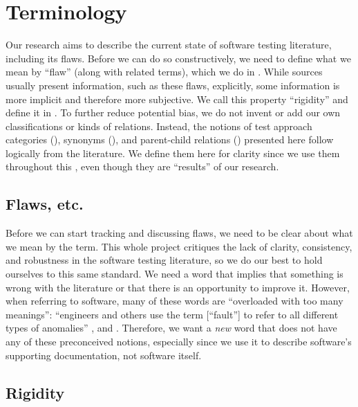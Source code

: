 \section{Terminology}
\label{terminology}

Our research aims to describe the current state of software testing literature,
including its flaws. Before we can do so constructively, we need to define what
we mean by ``flaw'' (along with related terms), which we do in .
While sources usually present information, such as these flaws, explicitly,
some information is more implicit and therefore more subjective. We call
this property ``rigidity'' and define it in . To further
reduce potential bias, we do not invent or add our own
classifications or kinds of relations. Instead, the notions of test approach
categories (), synonyms (), and
parent-child relations () presented here
follow logically from the literature. We define them here for clarity
since we use them throughout this \docType{}, even though they are
``results'' of our research.

\subsection{Flaws, etc.}\label{flaw-def}

Before we can start tracking and discussing flaws, we need to be clear about
what we mean by the term. This whole project critiques the lack of clarity,
consistency, and robustness in the software testing literature, so we do our
best to hold ourselves to this same standard.
We need a word that implies that something is wrong with the literature
or that there is an opportunity to improve it. However, when referring to
software, many of these words are ``overloaded with too many meanings'':
``engineers and others use the term [``fault''] to refer to all different types
of anomalies'' \citep[p.~12\=/3]{SWEBOK2024}, and \genDefectFlaw{}. Therefore,
we want a \emph{new} word that does not have any of these preconceived notions,
especially since we use it to describe software's supporting documentation, not
software itself.

\subsection{Rigidity}
\label{rigidity}

\def\impKeywordsCode{\seeSrcCode{82167b7}{scripts/helpers.py}{21}{49}}


